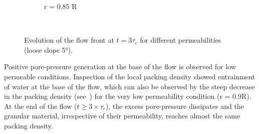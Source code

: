 \begin{figure}
{\begin{subfigure}[b]{0.95\textwidth}
    \caption{r = 0.85 R}
    \label{fig:LBM_660_Slope5_r085}
\end{subfigure}
}\\
\caption{Evolution of the flow front at $t = 3\tau_c$ for different 
permeabilities (loose slope 5\si{\degree}).}
\label{fig:slope_loose_5}
\end{figure}

Positive pore-pressure generation at the base of the flow is observed for low 
permeable conditions. Inspection of the local packing density showed 
entrainment of water at the base of the flow, which can also be observed by the 
steep decrease in the packing density (see~) for the very low 
permeability condition (r = 0.9R). At the end of the flow ($t \ge 3 \times 
\tau_c$), the excess pore-pressure dissipates and the granular material, 
irrespective of their permeability, reaches almost the same packing density.


